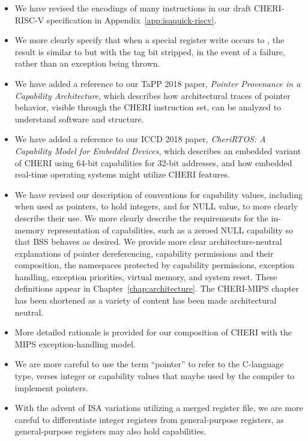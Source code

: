 \begin{itemize}
\item We have revised the encodings of many instructions in our draft
  CHERI-RISC-V specification in Appendix~\ref{app:isaquick-riscv}.

\item We more clearly specify that when a special register write occurs to
  \EPC{}, the result is similar to  but with the tag
  bit stripped, in the event of a failure, rather than an exception being
  thrown.

\item We have added a reference to our TaPP 2018 paper, \textit{Pointer
  Provenance in a Capability Architecture}, which describes how architectural
  traces of pointer behavior, visible through the CHERI instruction set, can
  be analyzed to understand software and structure.

\item We have added a reference to our ICCD 2018 paper, \textit{CheriRTOS:
  A Capability Model for Embedded Devices}, which describes an embedded
  variant of CHERI using 64-bit capabilities for 32-bit addresses, and how
  embedded real-time operating systems might utilize CHERI features.

\item We have revised our description of conventions for capability values,
  including when used as pointers, to hold integers, and for NULL value, to
  more clearly describe their use.
  We more clearly describe the requirements for the in-memory
  representation of capabilities, such as a zeroed NULL capability so that
  BSS behaves as desired.
  We provide more clear architecture-neutral explanations of pointer
  dereferencing, capability
  permissions and their composition, the namespaces protected by capability
  permissions, exception handling, exception priorities, virtual memory, and
  system reset.
  These definitions appear in Chapter~\ref{chap:architecture}.
  The CHERI-MIPS chapter has been
  shortened as a variety of content has been made architectural neutral.

\item More detailed rationale is provided for our composition of CHERI with
  the MIPS exception-handling model.

\item We are more careful to use the term ``pointer'' to refer to the
  C-language type, verses integer or capability values that maybe used by the
  compiler to implement pointers.

\item With the advent of ISA variations utilizing a merged register file, we
  are more careful to differentiate integer registers from general-purpose
  registers, as general-purpose registers may also hold capabilities.


\end{itemize}
